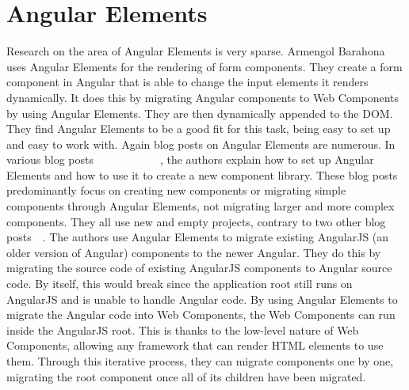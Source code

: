 \section{Angular Elements}
Research on the area of Angular Elements is very sparse. Armengol Barahona \etal{}~\cite{armengol2020development} uses Angular Elements for the rendering of form components. They create a form component in Angular that is able to change the input elements it renders dynamically. It does this by migrating Angular components to Web Components by using Angular Elements. They are then dynamically appended to the DOM. They find Angular Elements to be a good fit for this task, being easy to set up and easy to work with.
Again blog posts on Angular Elements are numerous. In various blog posts~~~~~~~~~~~~, the authors explain how to set up Angular Elements and how to use it to create a new component library. These blog posts predominantly focus on creating new components or migrating simple components through Angular Elements, not migrating larger and more complex components. They all use new and empty projects, contrary to two other blog posts~~. The authors use Angular Elements to migrate existing AngularJS (an older version of Angular) components to the newer Angular. They do this by migrating the source code of existing AngularJS components to Angular source code. By itself, this would break since the application root still runs on AngularJS and is unable to handle Angular code. By using Angular Elements to migrate the Angular code into Web Components, the Web Components can run inside the AngularJS root. This is thanks to the low-level nature of Web Components, allowing any framework that can render HTML elements to use them. Through this iterative process, they can migrate components one by one, migrating the root component once all of its children have been migrated.

